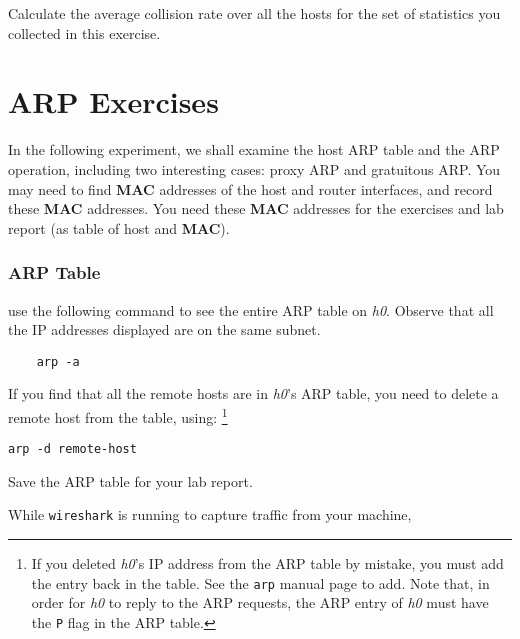 \documentclass{UTNetLab}
\begin{document}
    \begin{report}
        \item Calculate the average collision rate over all the hosts for the set of statistics you collected in this exercise.
    \end{report}

\part{ARP Exercises}
    In the following experiment, we shall examine the host ARP table and the ARP operation, including two interesting cases: proxy ARP and gratuitous ARP.
    You may need to find \textbf{MAC} addresses of the host and router interfaces, and record these \textbf{MAC} addresses.
    You need these \textbf{MAC} addresses for the exercises and lab report (as table of host and \textbf{MAC}).

\section{ARP Table}
     use the following command to see the entire ARP table on \textit{h0}.  Observe that all the IP addresses displayed are on the same subnet.
    
    \begin{lstlisting}
    arp -a
    \end{lstlisting}
   
    If you find that all the remote hosts are in \textit{h0}’s ARP table, you need to delete a remote host from the table, using:
    \footnote{If you deleted \textit{h0}’s IP address from the ARP table by mistake, you must add the entry back in the table.
    See the \lstinline{arp} manual page to add.
    Note that, in order for \textit{h0} to reply to the ARP requests, the ARP entry of \textit{h0} must have the \lstinline{P} flag in the ARP table.}
    
    \begin{lstlisting}[emph={remote-host}]
    arp -d remote-host
    \end{lstlisting}

    Save the ARP table for your lab report.
    
    While \lstinline{wireshark} is running to capture traffic from your machine,
    
\end{document}
